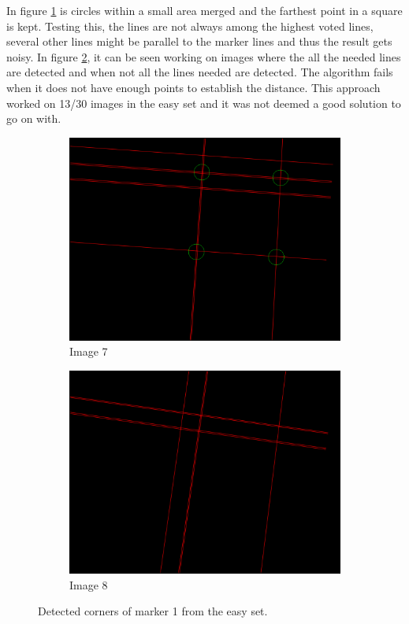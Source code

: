 In figure \ref{fig:crossing_points} is circles within a small area merged and the farthest point in a square is kept.
Testing this, the lines are not always among the highest voted lines, several other lines might be parallel to the marker lines and thus the result gets noisy.
In figure \ref{fig:crossing_points_marker}, it can be seen working on images where the all the needed lines are detected and when not all the lines needed are detected. 
The algorithm fails when it does not have enough points to establish the distance.
This approach worked on 13/30 images in the easy set and it was not deemed a good solution to go on with.

\begin{figure}[H]
 \centering
 \begin{subfigure}{\exampleWidth}
 \includegraphics[width=\linewidth]{graphics/Detected_points_marker1a_7}
 \caption{Image 7}
 \label{fig:crossing_points}
 \end{subfigure}
 \begin{subfigure}{\exampleWidth}
 \includegraphics[width=\linewidth]{graphics/Detected_points_marker1a_8}
 \caption{Image 8}
 \end{subfigure}
 \caption{Detected corners of marker 1 from the easy set.}
 \label{fig:crossing_points_marker}
\end{figure}